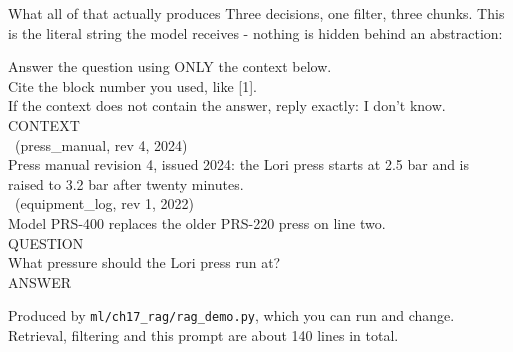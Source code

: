 \documentclass[aspectratio=169]{beamer}
\begin{document}
\begin{frame}{What all of that actually produces}
  \vspace{0.3em}
  {\footnotesize Three decisions, one filter, three chunks. This is the literal string the
  model receives - nothing is hidden behind an abstraction:}

  \vspace{0.3em}
  \begin{center}
  \begin{tcolorbox}[colback=lightbg, colframe=gray, boxrule=0.5pt, arc=2pt,
                    width=0.96\textwidth, left=4pt, right=4pt, top=3pt, bottom=3pt]
    \ttfamily\scriptsize
    Answer the question using ONLY the context below.\\
    Cite the block number you used, like [1].\\
    If the context does not contain the answer, reply exactly: I don't know.\\[0.4em]
    CONTEXT\\
    \rbrack\ (press\_manual, rev 4, 2024)\\
    Press manual revision 4, issued 2024: the Lori press starts at 2.5 bar and is\\
    raised to 3.2 bar after twenty minutes.\\[0.3em]
    \rbrack\ (equipment\_log, rev 1, 2022)\\
    Model PRS-400 replaces the older PRS-220 press on line two.\\[0.4em]
    QUESTION\\
    What pressure should the Lori press run at?\\[0.4em]
    ANSWER
  \end{tcolorbox}
  \end{center}

  \vspace{0.2em}
  {\footnotesize\color{gray}Produced by \texttt{ml/ch17\_rag/rag\_demo.py}, which you can run
  and change. Retrieval, filtering and this prompt are about 140 lines in total.}
\end{frame}
\end{document}
